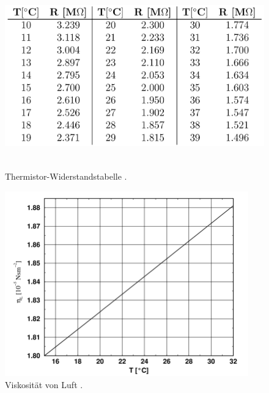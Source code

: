\begin{figure}
  \centering
  \includegraphics[height=8cm]{ressources/thermo.png}
  \caption{Thermistor-Widerstandstabelle \cite{skript}.}
  \label{tab:thermo}
\end{figure}
\begin{figure}
  \centering
  \includegraphics[height=8cm]{ressources/luft.png}
  \caption{Viskosität von Luft \cite{skript}.}
  \label{luft_n_shit}
\end{figure}


% 
% 
%

